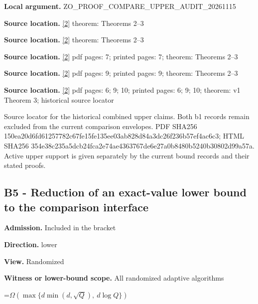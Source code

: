 \documentclass[10pt,a4paper]{article}
\newcommand{\AtlasMath}[1]{\par\begingroup\centering\setbox0=\hbox{$\displaystyle #1$}\ifdim\wd0>1.4\linewidth\typeout{ATLAS WIDE FORMULA: \the\wd0}\fi\ifdim\wd0>\linewidth\resizebox{\linewidth}{!}{\box0}\else\box0\fi\par\endgroup}
\begin{document}
\textbf{Local argument.} ZO\_PROOF\_COMPARE\_UPPER\_AUDIT\_20261115



\textbf{Source location.} \href{https://arxiv.org/html/2405.11454v1}{[2]} theorem: Theorems 2--3



\textbf{Source location.} \href{https://arxiv.org/html/2405.11454v1}{[2]} theorem: Theorems 2--3



\textbf{Source location.} \href{https://arxiv.org/html/2405.11454v1}{[2]} pdf pages: 7; printed pages: 7; theorem: Theorems 2--3



\textbf{Source location.} \href{https://arxiv.org/html/2405.11454v1}{[2]} pdf pages: 9; printed pages: 9; theorem: Theorems 2--3



\textbf{Source location.} \href{https://arxiv.org/html/2405.11454v1}{[2]} pdf pages: 6; 9; 10; printed pages: 6; 9; 10; theorem: v1 Theorem 3; historical source locator



Source locator for the historical combined upper claims. Both b1 records remain excluded from the current comparison envelopes. PDF SHA256 150ea20d6fd61257782c67fe\allowbreak{}15fe135ee03ab828d84a3dc2\allowbreak{}6f236b57ef4ac6c3; HTML SHA256 354e38c235a5dcb24fca2e74\allowbreak{}ae4363767de6e27a0b8480b5\allowbreak{}240b30802d99a57a. Active upper support is given separately by the current bound records and their stated proofs.



\subsection{B5 - Reduction of an exact-value lower bound to the comparison interface}


\textbf{Admission.} Included in the bracket



\textbf{Direction.} lower



\textbf{View.} Randomized



\textbf{Witness or lower-bound scope.} All randomized adaptive algorithms



\AtlasMath{\Omega\!\left(\max\{d\min(d,\sqrt Q),\ d\log Q\}\right)}
\end{document}

